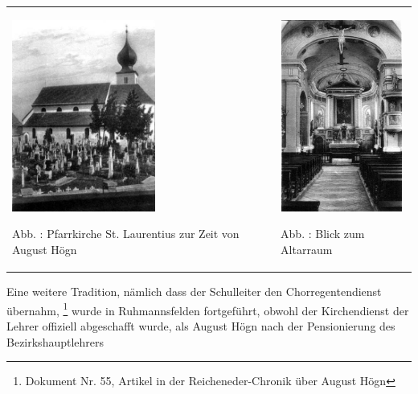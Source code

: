 \documentclass[a4paper]{article}
\newcounter{Abb}
\renewcommand\theAbb{\arabic{Abb}}
\begin{document}
\begin{center}
\begin{minipage}{9.491cm}
\begin{flushleft}
\tablefirsthead{}
\tablehead{}
\tabletail{}
\tablelasttail{}
\begin{supertabular}{m{4.8960004cm}m{4.196cm}}

\includegraphics[width=4.713cm,height=6.301cm]{pictures/zulassungsarbeit-img025.jpg}

Abb. \stepcounter{Abb}{\theAbb}: Pfarrkirche St. Laurentius zur Zeit von
August Högn &

\includegraphics[width=4.013cm,height=6.292cm]{pictures/zulassungsarbeit-img026.jpg}

Abb. \stepcounter{Abb}{\theAbb}: Blick zum Altarraum\\
\end{supertabular}
\end{flushleft}
\end{minipage}
\end{center}
Eine weitere Tradition, nämlich dass der Schulleiter den
Chorregentendienst übernahm, \footnote{Dokument Nr. 55, Artikel in der
Reicheneder-Chronik über August Högn} wurde in Ruhmannsfelden
fortgeführt, obwohl der Kirchendienst der Lehrer offiziell abgeschafft
wurde, als August Högn nach der Pensionierung des Bezirkshauptlehrers
\end{document}
